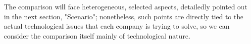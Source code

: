 The comparison will face heterogeneous, selected aspects, detailedly pointed out in the next section, "Scenario"; nonetheless, such points are directly tied to the actual technological issues that each company is trying to solve, so we can consider the comparison itself mainly of technological nature.